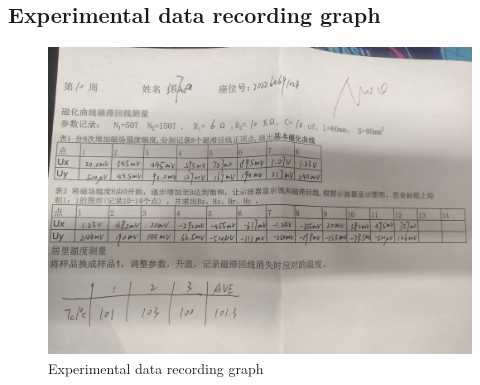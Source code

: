 \documentclass[UTF8]{article}
\begin{document}
\begin{appendix}
 \section{Experimental data recording graph} 
     	\begin{figure}[H]
     	    	\centering
     	    	\includegraphics[clip,scale=0.8,trim={0 0 0 0}]{fig/fig13.png}
     	        \caption{Experimental data recording graph}
     	        \label{figure.19}
         \end{figure} 
 \end{appendix}        
\end{document}
